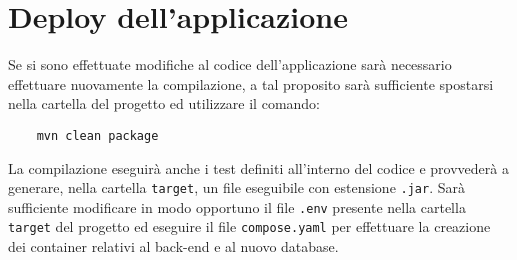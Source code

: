 \section{Deploy dell'applicazione}
Se si sono effettuate modifiche al codice dell'applicazione sarà necessario effettuare nuovamente la compilazione, a tal proposito sarà sufficiente spostarsi nella cartella del progetto ed utilizzare il comando:

\begin{lstlisting}
    mvn clean package
\end{lstlisting}

\noindent
La compilazione eseguirà anche i test definiti all'interno del codice e provvederà a generare, nella cartella \texttt{target}, un file eseguibile con estensione \texttt{.jar}. 
Sarà sufficiente modificare in modo opportuno il file \texttt{.env} presente nella cartella \texttt{target} del progetto ed eseguire il file \texttt{compose.yaml} per effettuare la creazione dei container relativi al back-end e al nuovo database.